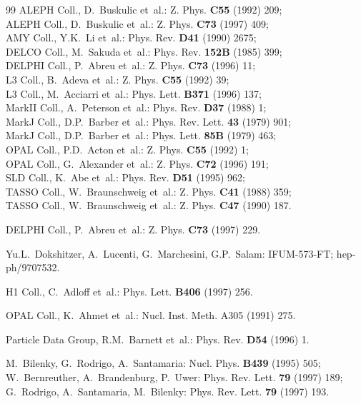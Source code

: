 \documentclass[12pt,a4paper,twoside]{article}
\begin{document}
\begin{thebibliography}{99}
ALEPH Coll., D.~Buskulic et~al.:     Z. Phys. {\bf C55} (1992) 209;\\
ALEPH Coll., D.~Buskulic et~al.:     Z. Phys. {\bf C73} (1997) 409;\\
AMY   Coll., Y.K.~Li et~al.:         Phys. Rev. {\bf D41} (1990) 2675;\\
DELCO Coll., M.~Sakuda et~al.:       Phys. Rev. {\bf 152B} (1985) 399;\\
DELPHI Coll., P.~Abreu et~al.:       Z. Phys. {\bf C73} (1996) 11;\\
L3 Coll., B.~Adeva et~al.:           Z. Phys. {\bf C55} (1992) 39;\\
L3 Coll., M.~Acciarri et~al.:        Phys. Lett. {\bf B371} (1996) 137;\\
MarkII Coll., A.~Peterson et~al.:    Phys. Rev. {\bf D37} (1988) 1;\\
MarkJ Coll., D.P.~Barber et~al.:     Phys. Rev. Lett. {\bf 43} (1979) 901;\\
MarkJ Coll., D.P.~Barber et~al.:     Phys. Lett. {\bf 85B} (1979) 463;\\
OPAL Coll., P.D.~Acton et~al.:       Z. Phys. {\bf C55} (1992) 1;\\
OPAL Coll., G.~Alexander et~al.:     Z. Phys. {\bf C72} (1996) 191;\\
SLD Coll., K.~Abe et~al.:            Phys. Rev. {\bf D51} (1995) 962;\\
TASSO Coll., W.~Braunschweig et~al.: Z. Phys. {\bf C41} (1988) 359;\\
TASSO Coll., W.~Braunschweig et~al.: Z. Phys. {\bf C47} (1990) 187.

DELPHI Coll., P.~Abreu et~al.:       Z. Phys. {\bf C73} (1997) 229.

Yu.L.~Dokshitzer, A.~Lucenti, G.~Marchesini, G.P.~Salam:
                                     IFUM-573-FT; hep-ph/9707532.

H1 Coll., C.~Adloff et~al.:         Phys. Lett. {\bf B406} (1997) 256.

OPAL Coll., K.~Ahmet et~al.:        Nucl. Inst. Meth. {A305} (1991) 275.

Particle Data Group, R.M.~Barnett et~al.:
                                    Phys. Rev. {\bf D54} (1996) 1.


M.~Bilenky, G.~Rodrigo, A.~Santamaria:
                                    Nucl. Phys. {\bf B439} (1995) 505;\\
W.~Bernreuther, A.~Brandenburg, P.~Uwer:
                                    Phys. Rev. Lett. {\bf 79} (1997) 189;\\
G.~Rodrigo, A.~Santamaria, M.~Bilenky: 
                                    Phys. Rev. Lett. {\bf 79} (1997) 193.


\end{thebibliography}
\end{document}
